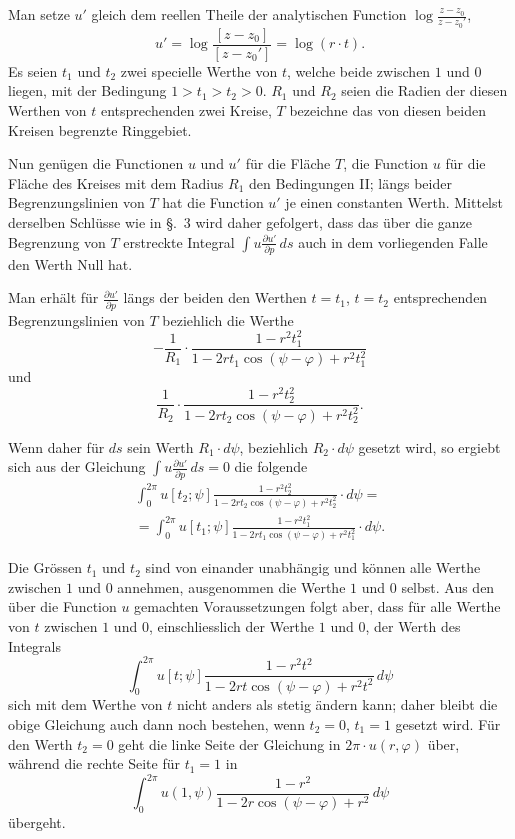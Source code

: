 \documentclass{article}
\begin{document}
Man setze $u'$ gleich dem reellen Theile der analytischen Function $\log \frac{z - z_0}{z - z_0'}$,
\[
u' = \log \frac{[z - z_0]}{[z - z_0']} = \log(r \cdot t).
\]
Es seien $t_1$ und $t_2$ zwei specielle Werthe von $t$, welche beide zwischen $1$ und $0$ liegen, mit der Bedingung $1 > t_1 > t_2 > 0$. $R_1$ und $R_2$ seien die Radien der diesen Werthen von $t$ entsprechenden zwei Kreise, $T$ bezeichne das von diesen beiden Kreisen begrenzte Ringgebiet.

Nun genügen die Functionen $u$ und $u'$ für die Fläche $T$, die Function $u$ für die Fläche des Kreises mit dem Radius $R_1$ den Bedingungen II; längs beider Begrenzungslinien von $T$ hat die Function $u'$ je einen constanten Werth. Mittelst derselben Schlüsse wie in §.~3 wird daher gefolgert, dass das über die ganze Begrenzung von $T$ erstreckte Integral $\displaystyle\int u \frac{\partial u'}{\partial p}\,ds$ auch in dem vorliegenden Falle den Werth Null hat.

Man erhält für $\frac{\partial u'}{\partial p}$ längs der beiden den Werthen $t = t_1$, $t = t_2$ entsprechenden Begrenzungslinien von $T$ beziehlich die Werthe
\[
-\frac{1}{R_1} \cdot \frac{1 - r^2 t_1^2}{1 - 2r t_1 \cos(\psi - \varphi) + r^2 t_1^2}
\]
und
\[
\frac{1}{R_2} \cdot \frac{1 - r^2 t_2^2}{1 - 2r t_2 \cos(\psi - \varphi) + r^2 t_2^2}.
\]

Wenn daher für $ds$ sein Werth $R_1 \cdot d\psi$, beziehlich $R_2 \cdot d\psi$ gesetzt wird, so ergiebt sich aus der Gleichung $\displaystyle\int u \frac{\partial u'}{\partial p}\,ds = 0$ die folgende
\[
\begin{gathered}
\int_0^{2\pi} u[t_2; \psi] \frac{1 - r^2 t_2^2}{1 - 2r t_2 \cos(\psi - \varphi) + r^2 t_2^2} \cdot d\psi = \\
= \int_0^{2\pi} u[t_1; \psi] \frac{1 - r^2 t_1^2}{1 - 2r t_1 \cos(\psi - \varphi) + r^2 t_1^2} \cdot d\psi.
\end{gathered}
\]

Die Grössen $t_1$ und $t_2$ sind von einander unabhängig und können alle Werthe zwischen $1$ und $0$ annehmen, ausgenommen die Werthe $1$ und $0$ selbst. Aus den über die Function $u$ gemachten Voraussetzungen folgt aber, dass für alle Werthe von $t$ zwischen $1$ und $0$, einschliesslich der Werthe $1$ und $0$, der Werth des Integrals
\[
\int_0^{2\pi} u[t; \psi] \frac{1 - r^2 t^2}{1 - 2rt \cos(\psi - \varphi) + r^2 t^2}\,d\psi
\]
sich mit dem Werthe von $t$ nicht anders als stetig ändern kann; daher bleibt die obige Gleichung auch dann noch bestehen, wenn $t_2 = 0$, $t_1 = 1$ gesetzt wird. Für den Werth $t_2 = 0$ geht die linke Seite der Gleichung in $2\pi \cdot u(r, \varphi)$ über, während die rechte Seite für $t_1 = 1$ in
\[
\int_0^{2\pi} u(1, \psi) \frac{1 - r^2}{1 - 2r \cos(\psi - \varphi) + r^2}\,d\psi
\]
übergeht.
\end{document}
